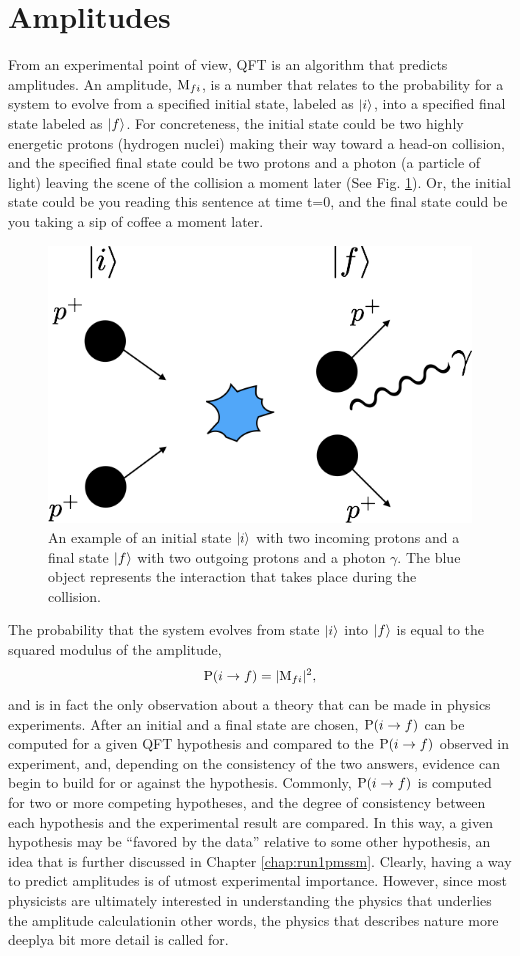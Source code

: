 \section{Amplitudes}
\label{sec:Amp}
From an experimental point of view, QFT is an algorithm that predicts amplitudes. An amplitude, ${\rm M}_{fi}$, is a number that relates to the probability for a system to evolve from a specified initial state, labeled as $\ket{i}$,
into a specified final state labeled as $\ket{f}$. For concreteness, the initial state could be two highly energetic protons (hydrogen nuclei) making their way toward a head-on collision, and the specified final state could be two protons and a photon (a particle of light) leaving the scene of the collision a moment later (See Fig. \ref{fig:ifstates}). Or, the initial state could be you reading this sentence at time t=0, and the final state could be you taking a sip of coffee a moment later.
\begin{figure}[h]\centering
\includegraphics[width=.55\linewidth]{figures/QFT/istate_fstate.png}
\caption{An example of an initial state $\ket{i}$ with two incoming protons and a final state $\ket{f}$ with two outgoing protons and a photon $\gamma$. The blue object represents the interaction that takes place during the collision.}
\label{fig:ifstates}
\end{figure}
 The probability that the system evolves from state $\ket{i}$ into $\ket{f}$ is equal to the squared modulus of the amplitude,
\begin{equation}
{\rm P}(i\rightarrow f)=|{\rm M}_{fi}|^{2},
\label{eq:Amp}
\end{equation}
and is in fact the only observation about a theory that can be made in physics experiments. After an initial and a final state are chosen, ${\rm P}(i\rightarrow f)$ can be computed for a given QFT hypothesis and compared to the ${\rm P}(i\rightarrow f)$ observed in experiment, and, depending on the consistency of the two answers, evidence can begin to build for or against the hypothesis. Commonly, ${\rm P}(i\rightarrow f)$ is computed for two or more competing hypotheses, and the degree of consistency between each hypothesis and the experimental result are compared. In this way, a given hypothesis may be ``favored by the data'' relative to some other hypothesis, an idea that is further discussed in Chapter \ref{chap:run1pmssm}. Clearly, having a way to predict amplitudes is of utmost experimental importance. However, since most physicists are ultimately interested in understanding the physics that underlies the amplitude calculation\textemdash in other words, the physics that describes nature more deeply\textemdash a bit more detail is called for.


